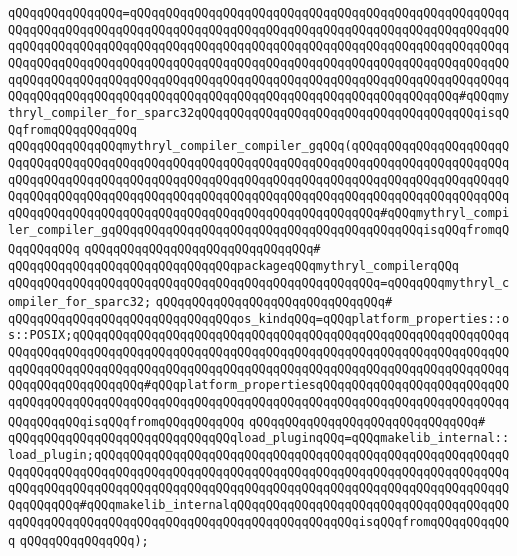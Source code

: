 \verb|qQQqqQQqqQQqqQQq=qQQqqQQqqQQqqQQqqQQqqQQqqQQqqQQqqQQqqQQqqQQqqQQqqQQqqQQqqQQqqQQqqQQqqQQqqQQqqQQqqQQqqQQqqQQqqQQqqQQqqQQqqQQqqQQqqQQqqQQqqQQqqQQqqQQqqQQqqQQqqQQqqQQqqQQqqQQqqQQqqQQqqQQqqQQqqQQqqQQqqQQqqQQqqQQqqQQqqQQqqQQqqQQqqQQqqQQqqQQqqQQqqQQqqQQqqQQqqQQqqQQqqQQqqQQqqQQqqQQqqQQqqQQqqQQqqQQqqQQqqQQqqQQqqQQqqQQqqQQqqQQqqQQqqQQqqQQqqQQqqQQqqQQqqQQqqQQqqQQqqQQqqQQqqQQqqQQqqQQqqQQqqQQqqQQqqQQqqQQqqQQqqQQqqQQqqQQq#qQQqmythryl_compiler_for_sparc32qQQqqQQqqQQqqQQqqQQqqQQqqQQqqQQqqQQqqQQqisqQQqfromqQQqqQQqqQQq|\newline
\verb|qQQqqQQqqQQqqQQqmythryl_compiler_compiler_gqQQq(qQQqqQQqqQQqqQQqqQQqqQQqqQQqqQQqqQQqqQQqqQQqqQQqqQQqqQQqqQQqqQQqqQQqqQQqqQQqqQQqqQQqqQQqqQQqqQQqqQQqqQQqqQQqqQQqqQQqqQQqqQQqqQQqqQQqqQQqqQQqqQQqqQQqqQQqqQQqqQQqqQQqqQQqqQQqqQQqqQQqqQQqqQQqqQQqqQQqqQQqqQQqqQQqqQQqqQQqqQQqqQQqqQQqqQQqqQQqqQQqqQQqqQQqqQQqqQQqqQQqqQQqqQQqqQQqqQQqqQQqqQQq#qQQqmythryl_compiler_compiler_gqQQqqQQqqQQqqQQqqQQqqQQqqQQqqQQqqQQqqQQqqQQqisqQQqfromqQQqqQQqqQQq|\newline
\verb|qQQqqQQqqQQqqQQqqQQqqQQqqQQqqQQq#|\newline
\verb|qQQqqQQqqQQqqQQqqQQqqQQqqQQqqQQqpackageqQQqmythryl_compilerqQQq|\newline
\verb|qQQqqQQqqQQqqQQqqQQqqQQqqQQqqQQqqQQqqQQqqQQqqQQqqQQq=qQQqqQQqmythryl_compiler_for_sparc32;|\newline
\verb|qQQqqQQqqQQqqQQqqQQqqQQqqQQqqQQq#|\newline
\verb|qQQqqQQqqQQqqQQqqQQqqQQqqQQqqQQqos_kindqQQq=qQQqplatform_properties::os::POSIX;qQQqqQQqqQQqqQQqqQQqqQQqqQQqqQQqqQQqqQQqqQQqqQQqqQQqqQQqqQQqqQQqqQQqqQQqqQQqqQQqqQQqqQQqqQQqqQQqqQQqqQQqqQQqqQQqqQQqqQQqqQQqqQQqqQQqqQQqqQQqqQQqqQQqqQQqqQQqqQQqqQQqqQQqqQQqqQQqqQQqqQQqqQQqqQQqqQQqqQQqqQQqqQQqqQQqqQQqqQQq#qQQqplatform_propertiesqQQqqQQqqQQqqQQqqQQqqQQqqQQqqQQqqQQqqQQqqQQqqQQqqQQqqQQqqQQqqQQqqQQqqQQqqQQqqQQqqQQqqQQqqQQqqQQqqQQqqQQqqQQqisqQQqfromqQQqqQQqqQQq|\newline
\verb|qQQqqQQqqQQqqQQqqQQqqQQqqQQqqQQq#|\newline
\verb|qQQqqQQqqQQqqQQqqQQqqQQqqQQqqQQqload_pluginqQQq=qQQqmakelib_internal::load_plugin;qQQqqQQqqQQqqQQqqQQqqQQqqQQqqQQqqQQqqQQqqQQqqQQqqQQqqQQqqQQqqQQqqQQqqQQqqQQqqQQqqQQqqQQqqQQqqQQqqQQqqQQqqQQqqQQqqQQqqQQqqQQqqQQqqQQqqQQqqQQqqQQqqQQqqQQqqQQqqQQqqQQqqQQqqQQqqQQqqQQqqQQqqQQqqQQqqQQqqQQqqQQqqQQq#qQQqmakelib_internalqQQqqQQqqQQqqQQqqQQqqQQqqQQqqQQqqQQqqQQqqQQqqQQqqQQqqQQqqQQqqQQqqQQqqQQqqQQqqQQqqQQqqQQqisqQQqfromqQQqqQQqqQQq|\newline
\verb|qQQqqQQqqQQqqQQq);|\newline

